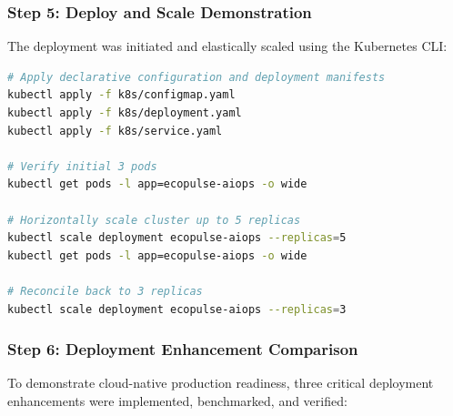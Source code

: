 \documentclass[12pt,a4paper]{article}
\begin{document}
\subsubsection*{Step 5: Deploy and Scale Demonstration}
The deployment was initiated and elastically scaled using the Kubernetes CLI:

\begin{lstlisting}[language=bash]
# Apply declarative configuration and deployment manifests
kubectl apply -f k8s/configmap.yaml
kubectl apply -f k8s/deployment.yaml
kubectl apply -f k8s/service.yaml

# Verify initial 3 pods
kubectl get pods -l app=ecopulse-aiops -o wide

# Horizontally scale cluster up to 5 replicas
kubectl scale deployment ecopulse-aiops --replicas=5
kubectl get pods -l app=ecopulse-aiops -o wide

# Reconcile back to 3 replicas
kubectl scale deployment ecopulse-aiops --replicas=3
\end{lstlisting}

\subsubsection*{Step 6: Deployment Enhancement Comparison}
To demonstrate cloud-native production readiness, three critical deployment enhancements were implemented, benchmarked, and verified:
\end{document}
